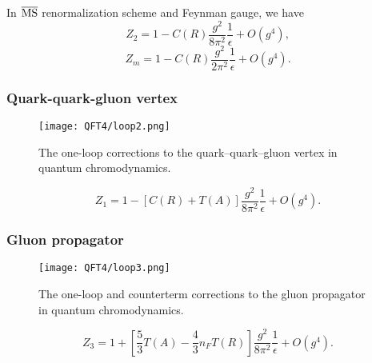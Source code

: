 \noindent
In $\overline{\rm MS}$ renormalization scheme and Feynman gauge, we have
\[Z_2 = 1 - C(R)\frac{g^2}{8\pi^2}\frac{1}{\epsilon} + O(g^4),\]
\[Z_m = 1 - C(R)\frac{g^2}{2\pi^2}\frac{1}{\epsilon} + O(g^4).\]

\subsubsection{Quark-quark-gluon vertex}
\begin{figure}[!h]
	\centering
	\texttt{[image: QFT4/loop2.png]}
	\caption{The one-loop corrections to the quark–quark–gluon vertex in quantum chromodynamics.}
\end{figure}
\[Z_1 = 1 - [C(R) + T(A)]\frac{g^2}{8\pi^2}\frac{1}{\epsilon} + O(g^4).\]

\subsubsection{Gluon propagator}
\begin{figure}[!h]
	\centering
	\texttt{[image: QFT4/loop3.png]}
	\caption{The one-loop and counterterm corrections to the gluon propagator in quantum chromodynamics.}
\end{figure}
\[Z_3 = 1 + \left[\frac{5}{3}T(A) - \frac{4}{3}n_F T(R)\right]\frac{g^2}{8\pi^2}\frac{1}{\epsilon} + O(g^4).\]

